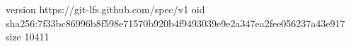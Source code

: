 version https://git-lfs.github.com/spec/v1
oid sha256:7f33bc86996b8f598e71570b920b4f9493039e9e2a347ea2fee056237a43e917
size 10411
